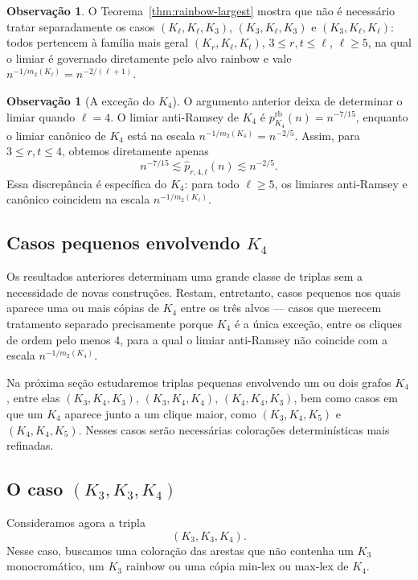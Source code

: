 \documentclass[reqno, 12pt]{amsart}
\numberwithin{equation}{section}
\theoremstyle{plain}
\theoremstyle{definition}
\newtheorem{remark}[theorem]{Observação}
\begin{document}
\begin{remark}
  O Teorema~\ref{thm:rainbow-largest} mostra que não é necessário
  tratar separadamente os casos $(K_\ell,K_\ell,K_3)$,
  $(K_3,K_\ell,K_3)$ e $(K_3,K_\ell,K_\ell)$: todos pertencem à
  família mais geral $(K_r,K_\ell,K_t)$, $3\leq r,t\leq\ell$,
  $\ell\geq5$, na qual o limiar é governado diretamente pelo alvo
  rainbow e vale $n^{-1/m_2(K_\ell)}=n^{-2/(\ell+1)}$.
\end{remark}

\begin{remark}[A exceção do $K_4$]
  \label{rem:K4-exception}
  O argumento anterior deixa de determinar o limiar quando
  $\ell=4$. O limiar anti-Ramsey de $K_4$ é
  $p^{\mathrm{rb}}_{K_4}(n)=n^{-7/15}$, enquanto o limiar canônico
  de $K_4$ está na escala $n^{-1/m_2(K_4)}=n^{-2/5}$. Assim, para
  $3\leq r,t\leq4$, obtemos diretamente apenas
  \[
    n^{-7/15}
    \lesssim
    \widehat p_{r,4,t}(n)
    \lesssim
    n^{-2/5}.
  \]
  Essa discrepância é específica do $K_4$: para todo $\ell\geq5$,
  os limiares anti-Ramsey e canônico coincidem na escala
  $n^{-1/m_2(K_\ell)}$.
\end{remark}

\subsection{Casos pequenos envolvendo $K_4$}

Os resultados anteriores determinam uma grande classe de triplas
sem a necessidade de novas construções. Restam, entretanto, casos
pequenos nos quais aparece uma ou mais cópias de $K_4$ entre os três
alvos — casos que merecem tratamento separado precisamente porque
$K_4$ é a única exceção, entre os cliques de ordem pelo menos $4$,
para a qual o limiar anti-Ramsey não coincide com a escala
$n^{-1/m_2(K_4)}$.

Na próxima seção estudaremos triplas pequenas envolvendo um ou dois
grafos $K_4$, entre elas $(K_3,K_4,K_3)$, $(K_3,K_4,K_4)$,
$(K_4,K_4,K_3)$, bem como casos em que um $K_4$ aparece junto a um
clique maior, como $(K_3,K_4,K_5)$ e $(K_4,K_4,K_5)$. Nesses casos
serão necessárias colorações determinísticas mais refinadas.

\subsection{O caso $(K_3,K_3,K_4)$}

Consideramos agora a tripla
\[
  (K_3,K_3,K_4).
\]
Nesse caso, buscamos uma coloração das arestas que não contenha
um $K_3$ monocromático, um $K_3$ rainbow ou uma cópia
min-lex ou max-lex de $K_4$.
\end{document}
